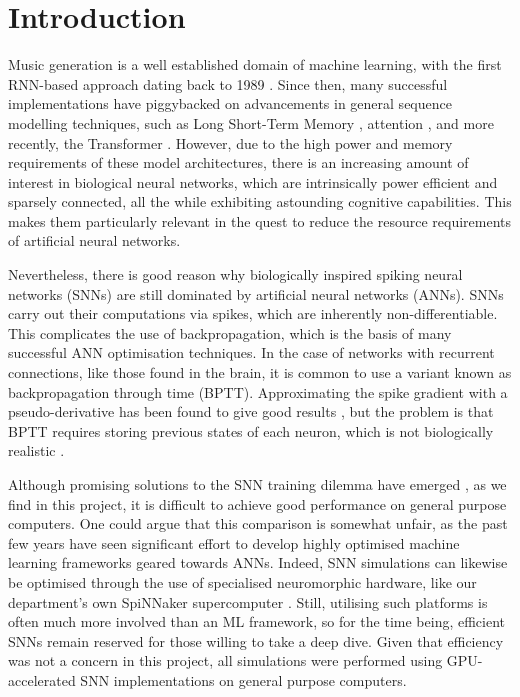 \documentclass[../../report.tex]{subfiles}
\begin{document}
\chapter{Introduction}

Music generation is a well established domain of machine learning, with the
first RNN-based approach dating back to 1989 \cite{Todd1989}. Since then, many
successful implementations have piggybacked on advancements in general sequence
modelling techniques, such as Long Short-Term Memory \cite{Eck2002}, attention
\cite{Waite2016}, and more recently, the Transformer \cite{Huang2018}. However,
due to the high power and memory requirements of these model architectures,
there is an increasing amount of interest in biological neural networks, which
are intrinsically power efficient and sparsely connected, all the while
exhibiting astounding cognitive capabilities. This makes them particularly
relevant in the quest to reduce the resource requirements of artificial neural
networks.

Nevertheless, there is good reason why biologically inspired spiking neural
networks (SNNs) are still dominated by artificial neural networks (ANNs). SNNs
carry out their computations via spikes, which are inherently
non-differentiable. This complicates the use of backpropagation, which is the
basis of many successful ANN optimisation techniques. In the case of networks
with recurrent connections, like those found in the brain, it is common to use a
variant known as backpropagation through time (BPTT). Approximating the spike
gradient with a pseudo-derivative has been found to give good results
\cite{Bellec2018}, but the problem is that BPTT requires storing previous states
of each neuron, which is not biologically realistic \cite{Lillicrap2019}.

Although promising solutions to the SNN training dilemma have emerged
\cite{Bellec2020}, as we find in this project, it is difficult to achieve good
performance on general purpose computers. One could argue that this comparison
is somewhat unfair, as the past few years have seen significant effort to
develop highly optimised machine learning frameworks geared towards ANNs.
Indeed, SNN simulations can likewise be optimised through the use of specialised
neuromorphic hardware, like our department's own SpiNNaker supercomputer
\cite{Furber2014}. Still, utilising such platforms is often much more involved
than an ML framework, so for the time being, efficient SNNs remain reserved for
those willing to take a deep dive. Given that efficiency was not a concern in
this project, all simulations were performed using GPU-accelerated SNN
implementations on general purpose computers.
\end{document}

